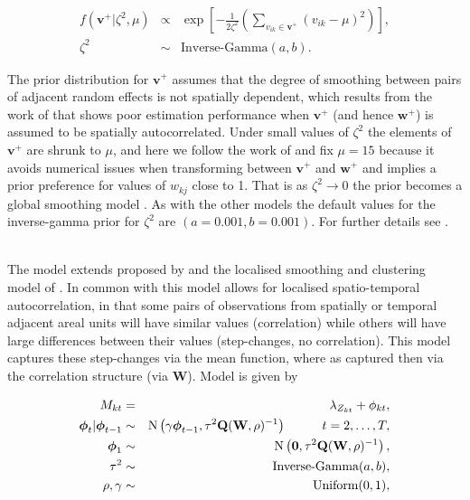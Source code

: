 \documentclass[article,shortnames,nojss]{jss}
\newcommand{\bd}[1]{\ensuremath{\mbox{\boldmath $#1$}}}
\begin{document}
\begin{eqnarray}
f(\mathbf{v}^{+}|\zeta^2, \mu) & \propto & \exp\left[-\frac{1}{2\zeta^2}\left(\sum_{v_{ik}\in\mathbf{v}^{+}}(v_{ik} - \mu)^2\right)\right], \label{caradaptive2}\\
\zeta^{2}&\sim&\mbox{Inverse-Gamma}(a, b).\nonumber
\end{eqnarray}

The prior distribution for $\mathbf{v}^+$ assumes that the degree of smoothing between pairs of adjacent random effects is not spatially dependent, which results from the  work of \cite{rushworth2014b} that shows poor estimation performance when $\mathbf{v}^+$ (and hence $\mathbf{w}^+$) is assumed to be spatially autocorrelated. Under small values of $\zeta^2$ the elements of  $\mathbf{v}^+$ are shrunk to $\mu$, and here we follow the work of \cite{rushworth2014b} and fix $\mu=15$ because it avoids numerical issues when transforming between $\mathbf{v}^+$ and $\mathbf{w}^+$ and implies a prior preference for values of $w_{kj}$ close to 1.  That is as $\zeta^2 \rightarrow 0$ the prior becomes a global smoothing model . As with the other models the default values for the inverse-gamma prior for $\zeta^{2}$ are $(a=0.001, b=0.001)$. For further details see \cite{rushworth2014b}.\vspace{1cm}


\\
The model extends  proposed by \cite{rushworth2014} and the localised smoothing and clustering model of \cite{lee2015b}. In common with  this model allows for localised spatio-temporal autocorrelation, in that some pairs of observations from spatially or temporal adjacent areal units will have similar values (correlation) while others will have large differences between their values (step-changes, no correlation). This model captures these step-changes via the mean function, where as  captured then via the correlation structure (via $\mathbf{W}$). Model  is given by

\begin{eqnarray}
M_{kt}&=&\lambda_{Z_{kt}} + \phi_{kt},\label{carcluster1}\\
\bd{\phi}_t|\bd{\phi}_{t-1} & \sim & \mbox{N}\left(\gamma\bd{\phi}_{t-1}, \tau^{2} \mathbf{Q}(\mathbf{W},\rho)^{-1}\right)\hspace{1cm} t=2,\ldots,T,\nonumber\\
\bd{\phi}_1 & \sim & \mbox{N}\left(\mathbf{0}, \tau^{2} \mathbf{Q}(\mathbf{W},\rho)^{-1}\right),\nonumber\\
\tau^2&\sim&\mbox{Inverse-Gamma}(a,b),\nonumber\\
\rho,\gamma&\sim&\mbox{Uniform}(0,1),\nonumber
\end{eqnarray}
\end{document}
